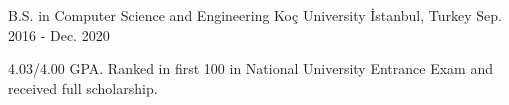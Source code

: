 
\vspace*{-1.5mm}

\begin{cventries}
 \cventry
    {B.S. in Computer Science and Engineering}
    {Koç University}
    {İstanbul, Turkey}
    {Sep. 2016 - Dec. 2020}
    {
      \begin{cvitems}
	      \item {4.03/4.00 GPA. Ranked in first 100 in National University Entrance Exam and received full scholarship.}
      \end{cvitems}
    }
\end{cventries}
